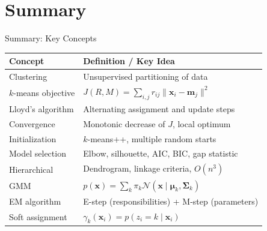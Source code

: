 \section{Summary}

\begin{frame}{Summary: Key Concepts}
  \renewcommand{\arraystretch}{1.5}
  \begin{center}
  \begin{tabular}{ll}
    \toprule
    \textbf{Concept} & \textbf{Definition / Key Idea} \\
    \midrule
    Clustering & Unsupervised partitioning of data \\
    $k$-means objective & $J(R,M)=\sum_{i,j} r_{ij}\|\mathbf{x}_i-\mathbf{m}_j\|^2$ \\
    Lloyd's algorithm & Alternating assignment and update steps \\
    Convergence & Monotonic decrease of $J$, local optimum \\
    Initialization & $k$-means++, multiple random starts \\
    Model selection & Elbow, silhouette, AIC, BIC, gap statistic \\
    Hierarchical & Dendrogram, linkage criteria, $O(n^3)$ \\
    GMM & $p(\mathbf{x}) = \sum_k \pi_k \mathcal{N}(\mathbf{x} \mid \boldsymbol{\mu}_k, \boldsymbol{\Sigma}_k)$ \\
    EM algorithm & E-step (responsibilities) + M-step (parameters) \\
    Soft assignment & $\gamma_k(\mathbf{x}_i) = p(z_i=k \mid \mathbf{x}_i)$ \\
    \bottomrule
  \end{tabular}
  \end{center}
\end{frame}

